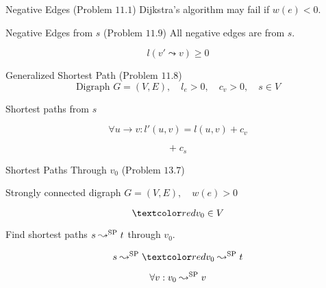 \begin{frame}{}
  \begin{exampleblock}{Negative Edges (Problem $11.1$)}
    Dijkstra's algorithm may fail if $w(e) < 0$.
  \end{exampleblock}

\end{frame}
\begin{frame}{}
  \begin{exampleblock}{Negative Edges from $s$ (Problem $11.9$)}
    All negative edges are from $s$.
  \end{exampleblock}

  \pause

  \pause
  \vspace{-0.50cm}
  \[
    l(v' \leadsto v) \ge 0
  \]
\end{frame}
\begin{frame}{}
  \begin{exampleblock}{Generalized Shortest Path (Problem $11.8$)}
    \[
      \text{Digraph } G = (V, E),\quad l_e > 0,\quad c_v > 0,\quad s \in V
    \]

    \centerline{Shortest paths from $s$}
  \end{exampleblock}

  \pause
  \[
    \forall u \to v: l'(u,v) = l(u,v) + c_v
  \]

  \pause
  \[
    +\; c_s
  \]
\end{frame}

\begin{frame}{}
  \begin{exampleblock}{Shortest Paths Through $v_0$ (Problem $13.7$)}
    \centerline{Strongly connected digraph $G = (V, E),\quad w(e) > 0$}
    \[
      \red{v_0 \in V}
    \]
    \centerline{Find shortest paths $s \leadsto^{\text{SP}} t$ through $v_0$.}
  \end{exampleblock}

  \pause
  \[
    s \leadsto^{\SP} \red{v_0} \leadsto^{\SP} t
  \]

  \pause
  \[
    \forall v: v_0 \leadsto^{\text{SP}} v
  \]
\end{frame}
